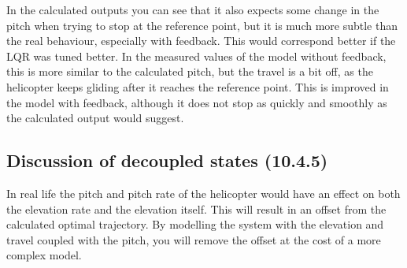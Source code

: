In the calculated outputs you can see that it also expects some change in the pitch when trying to stop at the reference point, but it is much more subtle than the real behaviour, especially with feedback. This would correspond better if the LQR was tuned better. In the measured values of the model without feedback, this is more similar to the calculated pitch, but the travel is a bit off, as the helicopter keeps gliding after it reaches the reference point. This is improved in the model with feedback, although it does not stop as quickly and smoothly as the calculated output would suggest.

\subsection{Discussion of decoupled states (10.4.5)}
In real life the pitch and pitch rate of the helicopter would have an effect on both the elevation rate and the elevation itself. This will result in an offset from the calculated optimal trajectory.  
By modelling the system with the elevation and travel coupled with the pitch, you will remove the offset at the cost of a more complex model.